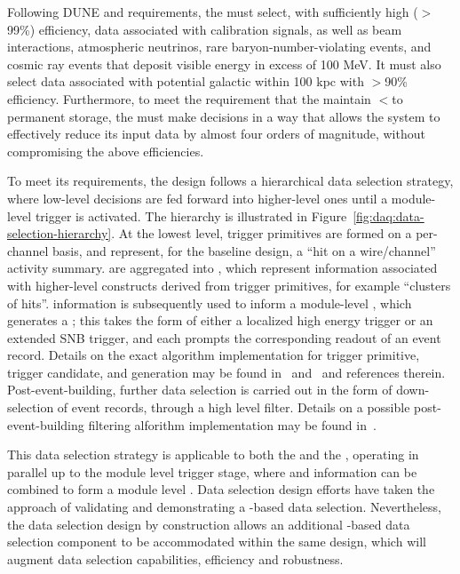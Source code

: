 Following DUNE  and  requirements, the
 must select, with sufficiently high ($>$99\%) efficiency, data associated with calibration
signals, as well as beam interactions,
atmospheric neutrinos, rare baryon-number-violating events, and cosmic
ray events that deposit visible energy in excess of 100 MeV. 
It must also select data associated with potential galactic
 within 100 kpc with $>$90\% efficiency. 
Furthermore, to meet the requirement that the   maintain
$<$\offsitepbpy to permanent storage, the 
must make  decisions in a way that allows the  
system to effectively reduce its input data by almost four orders of magnitude,
without compromising the above efficiencies.

To meet its requirements, the  design follows a hierarchical data selection strategy, where low-level decisions are fed forward into higher-level ones until a module-level trigger is activated. 
The hierarchy is illustrated in
Figure~\ref{fig:daq:data-selection-hierarchy}. 
At the lowest level, trigger primitives are formed on a per-channel basis, and represent, for the baseline design, a ``hit on a wire/channel'' activity summary. 
 are aggregated into , which represent information associated with higher-level constructs derived from trigger primitives, for example ``clusters of hits''. 
 information is subsequently used to inform a
module-level , which generates a ;
this takes the form of either a localized high energy trigger or an
extended SNB trigger, and each prompts the corresponding readout of an
event record. Details on the
exact algorithm implementation for trigger primitive, trigger
candidate, and  generation may be found
in~ and~ and references therein. 
Post-event-building, further data selection is carried out in the form
of down-selection of event records, through a high level
filter. Details on a possible post-event-building filtering alforithm
implementation may be found in~.

This data selection strategy is applicable to both the  and
the , operating in parallel up to the module level trigger stage, where  and  information can be combined to form a module level . 
Data selection design efforts have taken the approach of validating
and demonstrating a -based data selection. Nevertheless,
the data selection design by construction allows an additional
-based data selection component to be accommodated within
the same design, which will augment data selection capabilities, efficiency and robustness.

